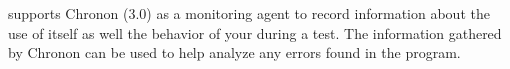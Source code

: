 \app{} supports Chronon (3.0) as a monitoring agent to record information about the use of \app{} itself as well the behavior of your \gdaut{} during a test. 
The information gathered by Chronon can be used to help analyze any errors found in the program. 

